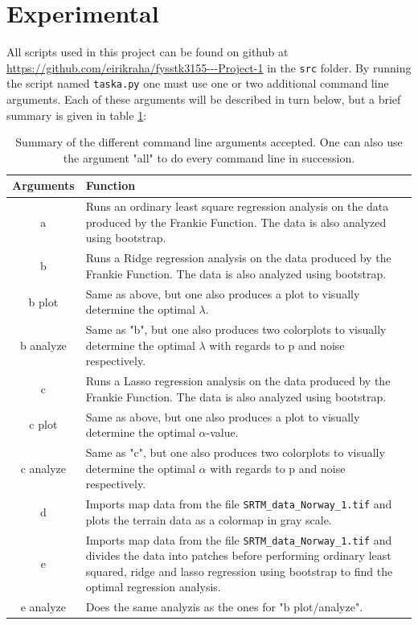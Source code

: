 \documentclass[12pt]{article}
\begin{document}
\section{Experimental}   \label{s:e}
All scripts used in this project can be found on github at \url{https://github.com/eirikraha/fysstk3155---Project-1} in the \texttt{src} folder. By running the script named \texttt{taska.py} one must use one or two additional command line arguments. Each of these arguments will be described in turn below, but a brief summary is given in table \ref{tabE:sum}:
\begin{table}[H]
\centering
\begin{tabular}{c|p{12cm}}
\textbf{Arguments} & \textbf{Function} \\ \hline
a & Runs an ordinary least square regression analysis on the data produced by the Frankie Function. The data is also analyzed using bootstrap. \\ \hline
b & Runs a Ridge regression analysis on the data produced by the Frankie Function. The data is also analyzed using bootstrap. \\ \hline
b plot & Same as above, but one also produces a plot to visually determine the optimal $\lambda$. \\ \hline
b analyze & Same as "b", but one also produces two colorplots to visually determine the optimal $\lambda$ with regards to p and noise respectively. \\ \hline
c & Runs a Lasso regression analysis on the data produced by the Frankie Function. The data is also analyzed using bootstrap. \\ \hline
c plot & Same as above, but one also produces a plot to visually determine the optimal $\alpha$-value. \\ \hline
c analyze & Same as "c", but one also produces two colorplots to visually determine the optimal $\alpha$ with regards to p and noise respectively. \\ \hline
d & Imports map data from the file \texttt{SRTM\_data\_Norway\_1.tif} and plots the terrain data as a colormap in gray scale. \\ \hline
e & Imports map data from the file \texttt{SRTM\_data\_Norway\_1.tif} and divides the data into patches before performing ordinary least squared, ridge and lasso regression using bootstrap to find the optimal regression analysis. \\ \hline
e analyze & Does the same analyzis as the ones for "b plot/analyze". 
\end{tabular}
\caption{Summary of the different command line arguments accepted. One can also use the argument "all" to do every command line in succession.}
\label{tabE:sum}
\end{table}
\end{document}
